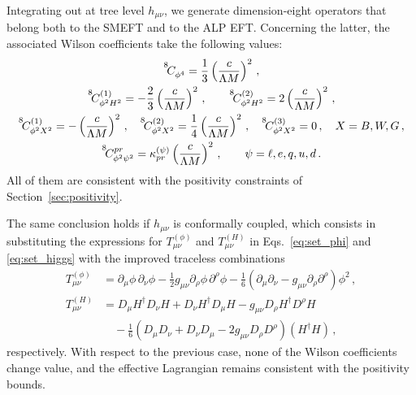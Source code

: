 Integrating out at tree level $h_{\mu\nu}$, we generate dimension-eight operators that belong both to the SMEFT and to the ALP EFT.
Concerning the latter, the associated Wilson coefficients take the following values:
\begin{gather}
    \coef{8}{\phi^4}{} =\frac{1}{3}\left( \frac{c}{\Lambda M}\right)^2\,,
    \\
    \coef{8}{\phi^2 H^2}{(1)} =-\frac{2}{3}\left( \frac{c}{\Lambda M}\right)^2\,, \qquad \coef{8}{\phi^2 H^2}{(2)} =2\left( \frac{c}{\Lambda M}\right)^2\,,
    \\
    \coef{8}{\phi^2 X^2}{(1)} =-\left( \frac{c}{\Lambda M}\right)^2\,, \quad 
    \coef{8}{\phi^2 X^2}{(2)} =\frac{1}{4}\left( \frac{c}{\Lambda M}\right)^2\,,\quad 
    \coef{8}{\phi^2 X^2}{(3)} =0 \,,
    \quad X=B,W,G\,,
    \\
    \coef{8}{\phi^2 \psi^2}{pr} =\kappa^{(\psi)}_{pr}\left( \frac{c}{\Lambda M}\right)^2\,,
    \qquad \psi = \ell,e,q,u,d\,.
\end{gather}
All of them are consistent with the positivity constraints of Section~\ref{sec:positivity}.

The same conclusion holds if $h_{\mu\nu}$ is conformally coupled, which consists in substituting the expressions for $T_{\mu\nu}^{(\phi)}$ and $T_{\mu\nu}^{(H)}$ in Eqs.~\eqref{eq:set_phi} and \eqref{eq:set_higgs} with the improved traceless combinations~\cite{Callan:1970ze}
\begin{align}
    T_{\mu\nu}^{(\phi)} &= \partial_\mu \phi \, \partial_\nu \phi - \frac{1}{2}g_{\mu\nu}\partial_\rho \phi \, \partial^\rho \phi - \frac{1}{6}(\partial_\mu \partial_\nu - g_{\mu\nu}\partial_\rho \partial^\rho)\phi^2\,,\\
    T_{\mu\nu}^{(H)} &= D_\mu H^\dagger D_\nu H + D_\nu H^\dagger D_\mu H - g_{\mu\nu}D_\rho H^\dagger D^\rho H \nonumber \\ &\quad - \frac{1}{6}(D_\mu D_\nu+D_\nu D_\mu -2 g_{\mu\nu}D_\rho D^\rho)(H^\dagger H)\,,
\end{align}
respectively.
With respect to the previous case, none of the Wilson coefficients change value, and the effective Lagrangian remains consistent with the positivity bounds.